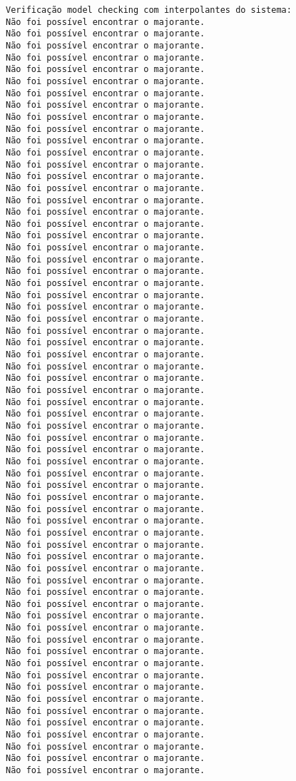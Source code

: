 \documentclass[11pt]{article}
\begin{document}
\begin{Verbatim}[commandchars=\\\{\}]
Verificação model checking com interpolantes do sistema:
Não foi possível encontrar o majorante.
Não foi possível encontrar o majorante.
Não foi possível encontrar o majorante.
Não foi possível encontrar o majorante.
Não foi possível encontrar o majorante.
Não foi possível encontrar o majorante.
Não foi possível encontrar o majorante.
Não foi possível encontrar o majorante.
Não foi possível encontrar o majorante.
Não foi possível encontrar o majorante.
Não foi possível encontrar o majorante.
Não foi possível encontrar o majorante.
Não foi possível encontrar o majorante.
Não foi possível encontrar o majorante.
Não foi possível encontrar o majorante.
Não foi possível encontrar o majorante.
Não foi possível encontrar o majorante.
Não foi possível encontrar o majorante.
Não foi possível encontrar o majorante.
Não foi possível encontrar o majorante.
Não foi possível encontrar o majorante.
Não foi possível encontrar o majorante.
Não foi possível encontrar o majorante.
Não foi possível encontrar o majorante.
Não foi possível encontrar o majorante.
Não foi possível encontrar o majorante.
Não foi possível encontrar o majorante.
Não foi possível encontrar o majorante.
Não foi possível encontrar o majorante.
Não foi possível encontrar o majorante.
Não foi possível encontrar o majorante.
Não foi possível encontrar o majorante.
Não foi possível encontrar o majorante.
Não foi possível encontrar o majorante.
Não foi possível encontrar o majorante.
Não foi possível encontrar o majorante.
Não foi possível encontrar o majorante.
Não foi possível encontrar o majorante.
Não foi possível encontrar o majorante.
Não foi possível encontrar o majorante.
Não foi possível encontrar o majorante.
Não foi possível encontrar o majorante.
Não foi possível encontrar o majorante.
Não foi possível encontrar o majorante.
Não foi possível encontrar o majorante.
Não foi possível encontrar o majorante.
Não foi possível encontrar o majorante.
Não foi possível encontrar o majorante.
Não foi possível encontrar o majorante.
Não foi possível encontrar o majorante.
Não foi possível encontrar o majorante.
Não foi possível encontrar o majorante.
Não foi possível encontrar o majorante.
Não foi possível encontrar o majorante.
Não foi possível encontrar o majorante.
Não foi possível encontrar o majorante.
Não foi possível encontrar o majorante.
Não foi possível encontrar o majorante.
Não foi possível encontrar o majorante.
Não foi possível encontrar o majorante.
Não foi possível encontrar o majorante.
Não foi possível encontrar o majorante.
Não foi possível encontrar o majorante.
Não foi possível encontrar o majorante.

\end{Verbatim}
\end{document}
